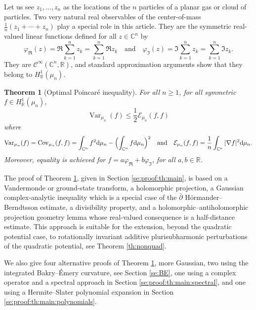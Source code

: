 \documentclass[11pt,reqno]{amsart}
\numberwithin{equation}{section}%
\numberwithin{figure}{section}%
\numberwithin{table}{section}
\theoremstyle{plain}
\newtheorem{theorem}{Theorem}[section]
\theoremstyle{definition}
\begin{document}
Let us see $z_1,\ldots,z_n$ as the locations of the $n$ particles of a planar
gas or cloud of particles. Two very natural real observables of the
center-of-mass $\frac{1}{n}(z_1+\cdots+z_n)$ play a special role in this
article. They are the symmetric real-valued linear functions defined for all
$z\in\mathbb{C}^n$ by
\begin{equation}
  \varphi_\Re(z)=\Re\sum_{k=1}^nz_k=\sum_{k=1}^n\Re z_k
  \quad\text{and}\quad
  \varphi_\Im(z)=\Im\sum_{k=1}^n z_k=\sum_{k=1}^n\Im z_k.
\end{equation}
They are $\mathcal{C}^\infty(\mathbb{C}^n,\mathbb{R})$, and standard
approximation arguments show that they belong to $H^1_{\mathbb{R}}(\mu_n)$.

\begin{theorem}[Optimal Poincaré inequality]\label{th:main}
  For all $n\geq1$, for all symmetric $f\in H^1_{\mathbb{R}}(\mu_n)$, 
  \begin{equation}\label{eq:pi}
    \operatorname{Var}_{\mu_n}(f) \leq \frac{1}{2}\mathcal{E}_{\mu_n}(f,f)
  \end{equation}
  where
  \begin{equation}
    \operatorname{Var}_{\mu_n}(f)
    =\operatorname{Cov}_{\mu_n}(f,f)=\int_{\mathbb{C}^n} f^2\mathrm{d}\mu_n-\Bigl(\int_{\mathbb{C}^n}f\mathrm{d}\mu_n\Bigr)^2
    \quad\text{and}\quad
    \mathcal{E}_{\mu_n}(f,f)=\frac{1}{n}\int_{\mathbb{C}^n}|\nabla f|^2\mathrm{d}\mu_n.
  \end{equation}
  Moreover, equality is achieved for $f=a\varphi_\Re+b\varphi_\Im$, for all
  $a,b\in\mathbb{R}$.
\end{theorem}

The proof of Theorem \ref{th:main}, given in Section \ref{se:proof:th:main}, is
based on a Vandermonde or ground-state transform, a holomorphic projection, a
Gaussian complex-analytic inequality which is a special case of the
$\bar\partial$ Hörmander--Berndtsson estimate, a divisibility property, and a
holomorphic--antiholomorphic projection geometry lemma whose real-valued
consequence is a half-distance estimate. This approach is suitable for the
extension, beyond the quadratic potential case, to rotationally invariant
additive plurisubharmonic perturbations of the quadratic potential, see
Theorem \ref{th:nonquad}.

We also give four alternative proofs of Theorem \ref{th:main}, more Gaussian,
two using the integrated Bakry--Émery curvature, see Section \ref{se:BE}, one
using a complex operator and a spectral approach in Section
\ref{se:proof:th:main:spectral}, and one using a Hermite--Slater polynomial
expansion in Section \ref{se:proof:th:main:polynomials}.
\end{document}
